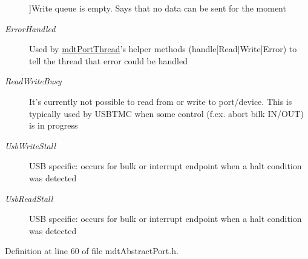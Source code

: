 \begin{Desc}
\begin{description}
{}]Write queue is empty. Says that no data can be sent for the moment \item[{\em 
\hypertarget{classmdt_abstract_port_ad4121bb930c95887e77f8bafa065a85eab0a372501b8916e3953897dc82fd3b3d}{Error\-Handled}\label{classmdt_abstract_port_ad4121bb930c95887e77f8bafa065a85eab0a372501b8916e3953897dc82fd3b3d}
}]Used by \hyperlink{classmdt_port_thread}{mdt\-Port\-Thread}'s helper methods (handle\mbox{[}Read$|$\-Write\mbox{]}Error) to tell the thread that error could be handled \item[{\em 
\hypertarget{classmdt_abstract_port_ad4121bb930c95887e77f8bafa065a85ea2d198672405289a1a7e662492ff073f8}{Read\-Write\-Busy}\label{classmdt_abstract_port_ad4121bb930c95887e77f8bafa065a85ea2d198672405289a1a7e662492ff073f8}
}]It's currently not possible to read from or write to port/device. This is typically used by U\-S\-B\-T\-M\-C when some control (f.\-ex. abort bilk I\-N/\-O\-U\-T) is in progress \item[{\em 
\hypertarget{classmdt_abstract_port_ad4121bb930c95887e77f8bafa065a85eaf89af56394b281f71247cd2eb4eaac62}{Usb\-Write\-Stall}\label{classmdt_abstract_port_ad4121bb930c95887e77f8bafa065a85eaf89af56394b281f71247cd2eb4eaac62}
}]U\-S\-B specific\-: occurs for bulk or interrupt endpoint when a halt condition was detected \item[{\em 
\hypertarget{classmdt_abstract_port_ad4121bb930c95887e77f8bafa065a85ea7b3edb569231d6ebd0c933974df60160}{Usb\-Read\-Stall}\label{classmdt_abstract_port_ad4121bb930c95887e77f8bafa065a85ea7b3edb569231d6ebd0c933974df60160}
}]U\-S\-B specific\-: occurs for bulk or interrupt endpoint when a halt condition was detected \end{description}
\end{Desc}


Definition at line 60 of file mdt\-Abstract\-Port.\-h.



